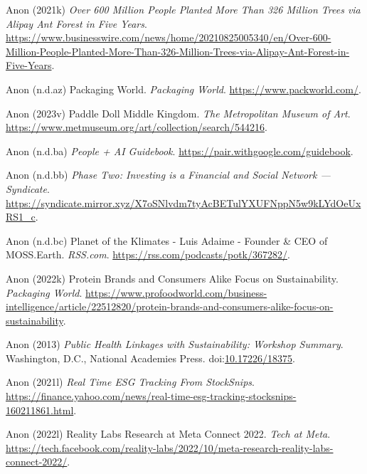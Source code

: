 \documentclass[
  letterpaper,
  DIV=11,
  numbers=noendperiod]{scrartcl}
\newlength{\cslhangindent}
\newenvironment{CSLReferences}[2] %
 {\begin{list}{}{%
  \setlength{\itemindent}{0pt}
  \setlength{\leftmargin}{0pt}
  \setlength{\parsep}{0pt}
  \ifodd #1
   \setlength{\leftmargin}{\cslhangindent}
   \setlength{\itemindent}{-1\cslhangindent}
  \fi
  \setlength{\itemsep}{#2\baselineskip}}}
 {\end{list}}
\begin{document}
\begin{CSLReferences}{0}{1}
Anon (2021k) \emph{Over 600 {Million People Planted More Than} 326
{Million Trees} via {Alipay Ant Forest} in {Five Years}}.
\url{https://www.businesswire.com/news/home/20210825005340/en/Over-600-Million-People-Planted-More-Than-326-Million-Trees-via-Alipay-Ant-Forest-in-Five-Years}.

Anon (n.d.az) Packaging {World}. \emph{Packaging World}.
\url{https://www.packworld.com/}.

Anon (2023v) Paddle {Doll} {\textbar} {Middle Kingdom}. \emph{The
Metropolitan Museum of Art}.
\url{https://www.metmuseum.org/art/collection/search/544216}.

Anon (n.d.ba) \emph{People + {AI Guidebook}}.
\url{https://pair.withgoogle.com/guidebook}.

Anon (n.d.bb) \emph{Phase {Two}: {Investing} is a {Financial} and
{Social Network} --- {Syndicate}}.
\url{https://syndicate.mirror.xyz/X7oSNlvdm7tyAcBETulYXUFNppN5w9kLYdOeUxRS1_c}.

Anon (n.d.bc) Planet of the {Klimates} - {Luis Adaime} - {Founder} \&
{CEO} of {MOSS}.{Earth}. \emph{RSS.com}.
\url{https://rss.com/podcasts/potk/367282/}.

Anon (2022k) Protein {Brands} and {Consumers Alike Focus} on
{Sustainability}. \emph{Packaging World}.
\url{https://www.profoodworld.com/business-intelligence/article/22512820/protein-brands-and-consumers-alike-focus-on-sustainability}.

Anon (2013) \emph{Public {Health Linkages} with {Sustainability}:
{Workshop Summary}}. Washington, D.C., National Academies Press.
doi:\href{https://doi.org/10.17226/18375}{10.17226/18375}.

Anon (2021l) \emph{Real {Time ESG Tracking From StockSnips}}.
\url{https://finance.yahoo.com/news/real-time-esg-tracking-stocksnips-160211861.html}.

Anon (2022l) Reality {Labs Research} at {Meta Connect} 2022. \emph{Tech
at Meta}.
\url{https://tech.facebook.com/reality-labs/2022/10/meta-research-reality-labs-connect-2022/}.


\end{CSLReferences}
\end{document}
